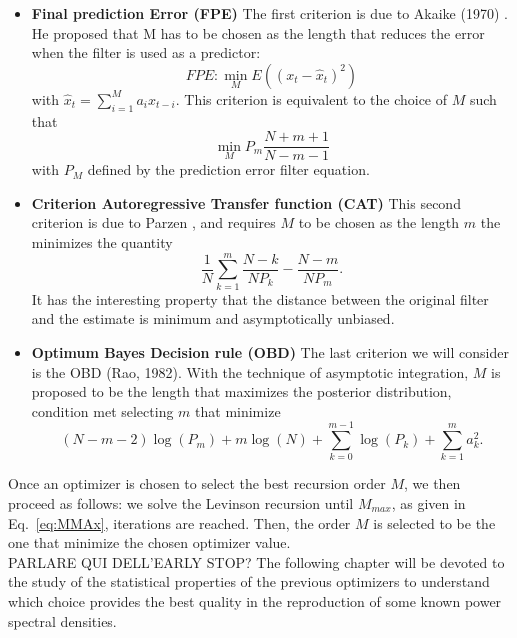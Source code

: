 \documentclass[twocolumn,showpacs,preprintnumbers,nofootinbib,prd,
superscriptaddress,10pt]{revtex4-1}
\begin{document}
\begin{itemize}
\item \textbf{Final prediction Error (FPE)} 
The first criterion is due to Akaike (1970) \cite{Akaike1970StatisticalPI}. He proposed that M has to be chosen as the length that reduces the error when the filter is used as a predictor: 
\begin{equation}
    FPE: \min_{M}E\left((x_t - \hat x_t) ^ 2\right)
\end{equation}
with $\hat{x}_t = \sum_{i = 1}^M a_i x_{t - i}$.  This criterion is equivalent to the choice of $M$ such that 
\begin{equation}
    \min_{M}P_{m} \frac{N + m + 1}{N - m - 1}
\end{equation}
with $P_M$ defined by the prediction error filter equation. 
\item \textbf{Criterion Autoregressive Transfer function (CAT)}
This second criterion is due to Parzen \cite{bhansali1986}, and requires $M$ to be chosen as the length $m$ the minimizes the quantity 
\begin{equation}
    \frac{1}{N}\sum_{k = 1}^m \frac{N - k}{N P_k} - \frac{N - m}{N P_m}.
\end{equation}
It has the interesting property that the distance between the original filter and the estimate is minimum and asymptotically unbiased. 

\item \textbf{Optimum Bayes Decision rule (OBD)} 
The last criterion we will consider is the OBD (Rao, 1982)\cite{doi:10.1029/WR018i004p01097}. With the technique of asymptotic integration, $M$ is proposed to be the length that maximizes the posterior distribution, condition met selecting $m$ that minimize 
   \begin{equation}
        (N - m - 2) \log(P_m) + m \log(N) + \sum_{k = 0}^{m-1} \log(P_k) + \sum_{k = 1}^{m} a_k^2.
    \end{equation}
\end{itemize}
Once an optimizer is chosen to select the best recursion order $M$, we then proceed as follows:  we solve the Levinson recursion until $M_{max}$, as given in Eq.~\ref{eq:MMAx}, iterations are reached. Then, the order $M$ is selected to be the one that minimize the chosen optimizer value. \\
PARLARE QUI DELL'EARLY STOP? 
The following chapter will be devoted to the study of the statistical properties of the previous optimizers to understand which choice provides the best quality in the reproduction of some known power spectral densities. 
\end{document}
